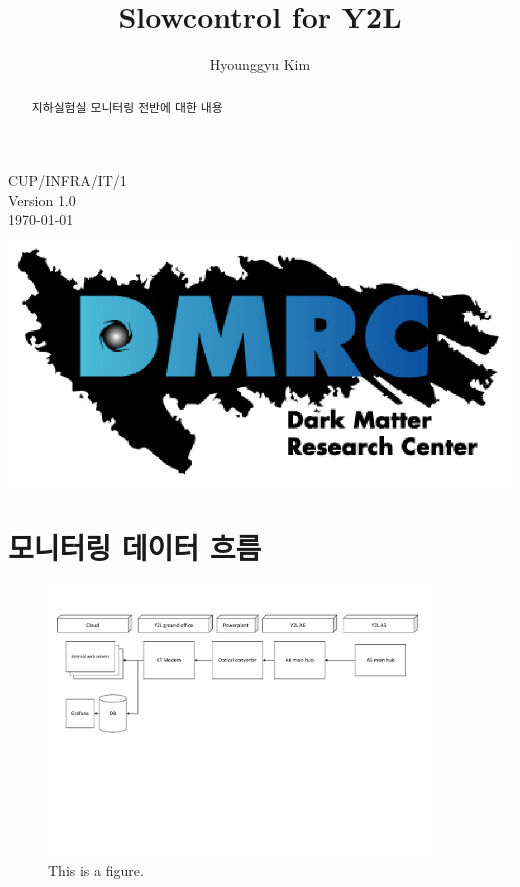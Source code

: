 \documentclass[onecolumn,showpacs,preprintnumbers,amsmath,amssymb,superscriptaddress,preprint]{revtex4-1}
\begin{document}
\begin{flushright}
CUP/INFRA/IT/1\\ %
Version 1.0\\ %
\today
\end{flushright}

\begin{center}
  \includegraphics[scale=0.5]{dmrc-logo.eps}
\end{center}
\title{Slowcontrol for Y2L}
\author{Hyounggyu Kim} %


\begin{abstract}
지하실험실 모니터링 전반에 대한 내용
\end{abstract}
\maketitle

\tableofcontents

\section{모니터링 데이터 흐름}

\begin{figure}[htb]
\begin{center}
\includegraphics[width=0.9\textwidth]{diagrams/test.pdf}
\caption{This is a figure.}
\end{center}
\end{figure}
\end{document}
